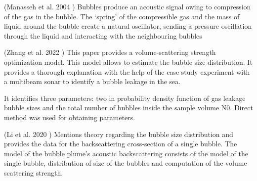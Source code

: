 (Manasseh et al. 2004 \cite{manasseh_anisotropy_2004}) Bubbles produce an acoustic signal owing to compression of the gas in the bubble. The ‘spring’ of the compressible gas and the mass of liquid around the bubble create a natural oscillator, sending a pressure oscillation through the liquid and interacting with the neighbouring bubbles

(Zhang et al. 2022 \cite{zhang_efficient_2022} ) This paper provides a volume-scattering strength optimization model. This model allows to estimate the bubble size distribution. It provides a thorough explanation with the help of the case study experiment with a multibeam sonar to identify a bubble leakage in the sea.

It identifies three parameters: two in probability density function of gas leakage bubble sizes and the total number of bubbles inside the sample volume N0. Direct method was used for obtaining parameters.

(Li et al. 2020 \cite{li_broadband_2020}) Mentions theory regarding the bubble size distribution and provides the data for the backscattering cross-section of a single bubble. The model of the bubble plume’s acoustic backscattering consists of the model of the single bubble, distribution of size of the bubbles and computation of the volume scattering strength.

